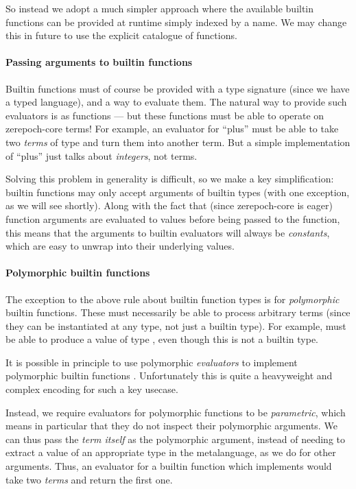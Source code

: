 So instead we adopt a much simpler approach where the available builtin functions can be provided at runtime simply indexed by a name.
We may change this in future to use the explicit catalogue of functions.

\paragraph{Passing arguments to builtin functions}

Builtin functions must of course be provided with a type signature (since we have a typed language), and a way to evaluate them.
The natural way to provide such evaluators is as functions --- but these functions must be able to operate on \gls{zerepoch-core} terms!
For example, an evaluator for ``plus'' must be able to take two \emph{terms} of type  and turn them into another term.
But a simple implementation of ``plus'' just talks about \emph{integers}, not terms.

Solving this problem in generality is difficult, so we make a key simplification: builtin functions may only accept arguments of builtin types (with one exception, as we will see shortly).
Along with the fact that (since \gls{zerepoch-core} is eager) function arguments are evaluated to values before being passed to the function, this means that the arguments to builtin evaluators will always be \emph{constants}, which are easy to unwrap into their underlying values.

\paragraph{Polymorphic builtin functions}
\label{sec:polymorphic-builtins}

The exception to the above rule about builtin function types is for \emph{polymorphic} builtin functions.
These must necessarily be able to process arbitrary terms (since they can be instantiated at any type, not just a builtin type).
For example,  must be able to produce a value of type , even though this is not a builtin type.

It is possible in principle to use polymorphic \emph{evaluators} to implement polymorphic builtin functions \autocite{lindley2012embedding}.
Unfortunately this is quite a heavyweight and complex encoding for such a key usecase.

Instead, we require evaluators for polymorphic functions to be \emph{parametric}, which means in particular that they do not inspect their polymorphic arguments.
We can thus pass the \emph{term itself} as the polymorphic argument, instead of needing to extract a value of an appropriate type in the metalanguage, as we do for other arguments.
Thus, an evaluator for a builtin function which implements  would take two \emph{terms} and return the first one.

